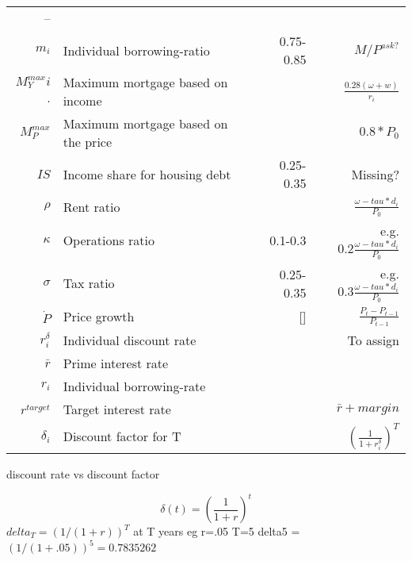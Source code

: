 \begin{tabular}{rlrr}
--        &  & \\
$m_i$          & Individual borrowing-ratio           & 0.75-0.85  & $M/P^{ask?}$ \\
$M^{max}_Yi$.  & Maximum mortgage based on income     &            & $\frac{0.28(\omega+w)}{r_i}$ \\
 $M^{max}_P$   & Maximum mortgage based on the price  &            & $0.8*P_0$ \\
$IS$           & Income share for housing debt        & 0.25-0.35  & Missing? \\
$\rho$         & Rent ratio                           &            & $\frac{\omega-tau*d_i}{P_0}$ \\
$\kappa $      & Operations ratio                     & 0.1-0.3    & e.g. $ 0.2\frac{\omega-tau*d_i}{P_0}$ \\
$\sigma$       & Tax ratio                            & 0.25-0.35  & e.g. $ 0.3\frac{\omega-tau*d_i}{P_0}$ \\
$\dot P $      & Price growth                         & []         & $\frac{P_t-P_{t-1}}{P_{t-1}}$\\
$r_i^\delta$   & Individual discount rate             &            & To assign \\
$\bar r$       & Prime interest rate                  &            & \\
$r_i$          & Individual borrowing-rate            &            & \\
$r^{target}$   & Target interest rate                 &            & $\bar r + margin$ \\
$\delta_i$     & Discount factor for T                &            & $\left(\frac{1}{1+r_i^\delta}\right)^T$ \\


\end{tabular}
\renewcommand{\arraystretch}{1.0}




discount rate vs discount factor

\[\delta(t)=\left(\frac{1}{1+r}\right)^t\]
    $delta_T=  (1/(1+r))^T$   at T years
    eg r=.05  T=5  delta5 =  $(1/(1+.05))^5 = 0.7835262$


